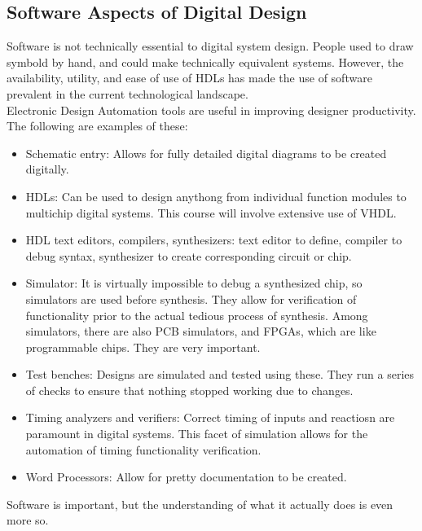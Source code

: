 \documentclass[nobib]{tufte-handout}
\begin{document}
\subsection{Software Aspects of Digital Design}
Software is not technically essential to digital system design. People used to
draw symbold by hand, and could make technically equivalent systems. However,
the availability, utility, and ease of use of HDLs has made the use of software
prevalent in the current technological landscape.\\ Electronic Design
Automation tools are useful in improving designer productivity. The following
are examples of these:
\begin{itemize}
    \item Schematic entry: Allows for fully detailed digital diagrams to be created
          digitally.
    \item HDLs: Can be used to design anythong from individual function modules to
          multichip digital systems. This course will involve extensive use of VHDL.
    \item HDL text editors, compilers, synthesizers: text editor to define, compiler to
          debug syntax, synthesizer to create corresponding circuit or chip.
    \item Simulator: It is virtually impossible to debug a synthesized chip, so
          simulators are used before synthesis. They allow for verification of
          functionality prior to the actual tedious process of synthesis. Among
          simulators, there are also PCB simulators, and FPGAs, which are like
          programmable chips. They are very important.
    \item Test benches: Designs are simulated and tested using these. They run a series
          of checks to ensure that nothing stopped working due to changes.
    \item Timing analyzers and verifiers: Correct timing of inputs and reactiosn are
          paramount in digital systems. This facet of simulation allows for the
          automation of timing functionality verification.
    \item Word Processors: Allow for pretty documentation to be created.
\end{itemize}
Software is important, but the understanding of what it actually does is even more so.
\end{document}
